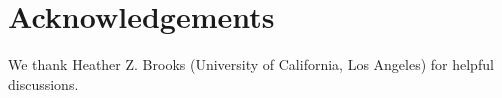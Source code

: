\documentclass[%
 reprint,
 amsmath,amssymb,
 aps,
]{revtex4-1}
\begin{document}

\section*{Acknowledgements}

{\color{red}We thank Heather Z. Brooks (University of California, Los Angeles) for helpful discussions.}





\end{document}
